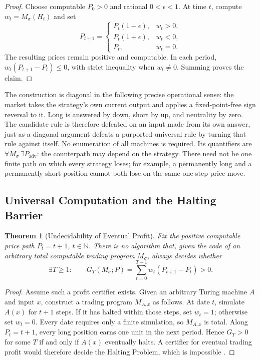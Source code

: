 \documentclass[aps,pra,reprint,superscriptaddress,amsmath,amssymb,floatfix]{revtex4-2}
\theoremstyle{plain}
\newtheorem{theorem}{Theorem}
\theoremstyle{definition}
\theoremstyle{remark}
\begin{document}
\begin{proof}
Choose computable \(P_0>0\) and rational \(0<\epsilon<1\). At time \(t\),
compute \(w_t=M_\sigma(H_t)\) and set
\begin{equation}
P_{t+1}=
\begin{cases}
P_t(1-\epsilon),&w_t>0,\\
P_t(1+\epsilon),&w_t<0,\\
P_t,&w_t=0.
\end{cases}
\label{eq:adversary}
\end{equation}
The resulting prices remain positive and computable. In each period,
\(w_t(P_{t+1}-P_t)\leq0\), with strict inequality when \(w_t\neq0\).
Summing proves the claim.
\end{proof}

The construction is diagonal in the following precise operational sense: the
market takes the strategy's own current output and applies a fixed-point-free
sign reversal to it. Long is answered by down, short by up, and neutrality by
zero. The candidate rule is therefore defeated on an input made from its own
answer, just as a diagonal argument defeats a purported universal rule by
turning that rule against itself. No enumeration of all machines is required.
Its quantifiers are
\(\forall M_\sigma\,\exists P_{\mathrm{adv}}\): the counterpath may depend on
the strategy. There need not be one finite path on which every strategy loses;
for example, a permanently long and a permanently short position cannot both
lose on the same one-step price move.

\subsection{Universal Computation and the Halting Barrier}

\begin{theorem}[Undecidability of Eventual Profit]
  \label{thm:profit-undecidable}
  Fix the positive computable price path \(P_t=t+1\), \(t\in\mathbb{N}\).
  There is no algorithm that, given the code of an arbitrary total computable
  trading program \(M_\sigma\), always decides whether
  \[
    \exists T\geq1:\qquad
    G_T(M_\sigma;P)=
    \sum_{t=0}^{T-1}w_t(P_{t+1}-P_t)>0.
  \]
\end{theorem}

\begin{proof}
Assume such a profit certifier exists. Given an arbitrary Turing machine
\(A\) and input \(x\), construct a trading program \(M_{A,x}\) as follows.
At date \(t\), simulate \(A(x)\) for \(t+1\) steps. If it has halted within
those steps, set \(w_t=1\); otherwise set \(w_t=0\). Every date requires only
a finite simulation, so \(M_{A,x}\) is total. Along \(P_t=t+1\), every long
position earns one unit in the next period. Hence \(G_T>0\) for some \(T\) if
and only if \(A(x)\) eventually halts. A certifier for eventual trading profit
would therefore decide the Halting Problem, which is impossible
\cite{turing-36}.
\end{proof}
\end{document}
